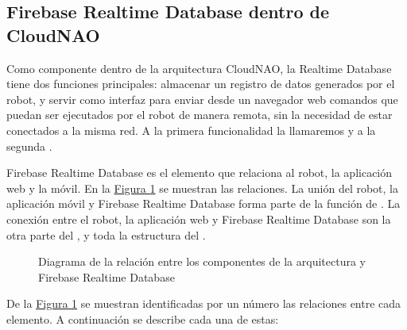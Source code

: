 \subsection{Firebase Realtime Database dentro de CloudNAO}
\label{\detokenize{chapter_two/desc_cloudnao:firebase-realtime-database-y-cloudnao}}
Como componente dentro de la arquitectura CloudNAO, la Realtime Database tiene
dos funciones principales: almacenar un registro de datos generados por el robot,
y servir como interfaz para enviar desde un navegador web comandos que puedan
ser ejecutados por el robot de manera remota, sin la necesidad de estar
conectados a la misma red. A la primera
funcionalidad la llamaremos  y a la segunda .

Firebase Realtime Database es el elemento que relaciona al robot, la aplicación
web y la móvil. En la \hyperref[\detokenize{chapter_two/desc_cloudnao:rtd-components-diagram}]{Figura \ref{\detokenize{chapter_two/desc_cloudnao:rtd-components-diagram}}} se muestran las relaciones.
La unión del robot, la aplicación móvil y Firebase Realtime Database forma parte de
la función de . La conexión entre el robot, la aplicación web y
Firebase Realtime Database son la otra parte del , y toda la
estructura del .

\begin{figure}[htbp]
\centering
\capstart

\noindent{}
\caption{Diagrama de la relación entre los componentes de la arquitectura y Firebase Realtime Database}\label{\detokenize{chapter_two/desc_cloudnao:rtd-components-diagram}}\end{figure}

De la \hyperref[\detokenize{chapter_two/desc_cloudnao:rtd-components-diagram}]{Figura \ref{\detokenize{chapter_two/desc_cloudnao:rtd-components-diagram}}} se muestran identificadas por un número
las relaciones entre cada elemento. A continuación se describe cada una de estas:

